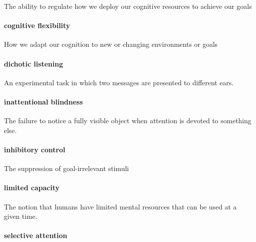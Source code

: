 \documentclass[
]{krantz}
\begin{document}
The ability to regulate how we deploy our cognitive resources to achieve our goals

\hypertarget{cognitive-flexibility}{%
\paragraph*{cognitive flexibility}\label{cognitive-flexibility}}

How we adapt our cognition to new or changing environments or goals

\hypertarget{dichotic-listening}{%
\paragraph*{dichotic listening}\label{dichotic-listening}}

An experimental task in which two messages are presented to different ears.

\hypertarget{inattentional-blindness}{%
\paragraph*{inattentional blindness}\label{inattentional-blindness}}

The failure to notice a fully visible object when attention is devoted to something else.

\hypertarget{inhibitory-control}{%
\paragraph*{inhibitory control}\label{inhibitory-control}}

The suppression of goal-irrelevant stimuli

\hypertarget{limited-capacity}{%
\paragraph*{limited capacity}\label{limited-capacity}}

The notion that humans have limited mental resources that can be used at a given time.

\hypertarget{selective-attention-1}{%
\paragraph*{selective attention}\label{selective-attention-1}}
\end{document}
